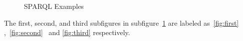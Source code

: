 \documentclass[DIV=calc, paper=a4, fontsize=12pt, onecolumn]{scrartcl}	 %
\begin{document}
  \begin{figure}[ht!]
    \begin{center}


    \end{center}
    \caption{%
	    SPARQL Examples
    }%
    \label{fig:subfigures}
  \end{figure}

  \noindent The first, second, and third subfigures in subfigure\
  \ref{fig:subfigures} are labeled as\
  \ref{fig:first} \cite{stenzhorn2008simplifying},\
  \ref{fig:second} \cite{stenzhorn2008simplifying}\
  and \ref{fig:third}  \cite{parachuri2008role} respectively.\\
\end{document}
